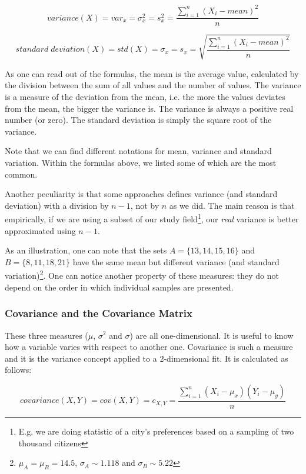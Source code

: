 \documentclass[12pt]{article}
\begin{document}
\begin{equation}
variance(X)=var_x=\sigma^2_x=s^2_x=\frac{\sum_{i=1}^{n}(X_i-mean)^2}{n}
\end{equation}

\begin{equation}
standard\;deviation(X)=std(X)=\sigma_x=s_x=\sqrt{\frac{\sum_{i=1}^{n}(X_i-mean)^2}{n}}
\end{equation}

As one can read out of the formulas, the mean is the average value, calculated by the division
between the sum of all values and the number of values. The variance is a measure of the deviation
from the mean, i.e. the more the values deviates from the mean, the bigger the variance is. The
variance is always a positive real number (or zero). The standard deviation is simply the square root of the
variance.

Note that we can find different notations for mean, variance and standard variation.
Within the formulas above, we listed some of which are the most common.

Another peculiarity is that some approaches defines variance (and standard deviation) 
with a division by $n-1$, not by $n$ as we did. The main reason is that empirically,
if we are using a subset of our study field\footnote{E.g. we are
doing statistic of a city's preferences based on a sampling of two thousand citizens}, our
\emph{real} variance is better approximated using $n-1$.

As an illustration, one can note that the sets $A = \{13,14,15,16\}$ and $B = \{8,11,18,21\}$ have
the same mean but different variance (and standard variation)\footnote{$\mu_A = \mu_B = 14.5$,
$\sigma_A \sim 1.118$ and $\sigma_B \sim 5.22$}. One can notice another property of these measures:
they do not depend on the order in which individual samples are presented.

\subsubsection{Covariance and the Covariance Matrix}
These three measures ($\mu$, $\sigma^2$ and $\sigma$) are all one-dimensional. It is useful
to know how a variable varies with respect to another one. Covariance is such a measure and
it is the variance concept applied to a 2-dimensional fit. It is calculated as follows:

\begin{equation}
covariance(X,Y)=cov(X,Y)=c_{X,Y}=\frac{\sum_{i=1}^{n}(X_i-\mu_x)(Y_i-\mu_y) }{n}
\end{equation}
\end{document}
